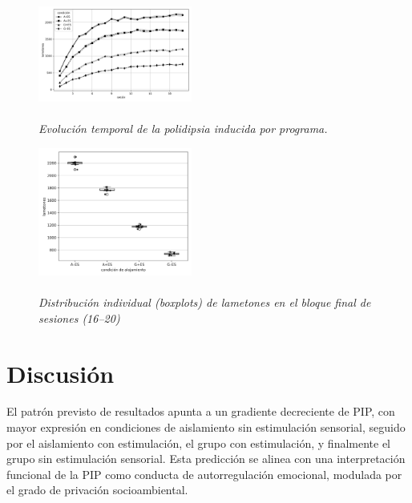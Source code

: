 \documentclass[12pt,a4paper]{article}
\begin{document}
\begin{multicols}{2}
\begin{figure}[H]
\begin{doublespace}
\captionsetup{labelfont=bf, labelsep=none}
\caption{\textit{\protect\\Evolución temporal de la polidipsia inducida por programa.}}
\label{fig:figura1}
\end{doublespace}
\centering
\includegraphics[width=0.45\textwidth]{figura1.png}
\end{figure}

\begin{figure}[H]
\begin{doublespace}
\captionsetup{labelfont=bf, labelsep=none}    
\caption{\textit{\protect\\Distribución individual (boxplots) de lametones en el bloque final de sesiones (16–20)}}
\label{fig:figura2}
\end{doublespace}
\centering
\includegraphics[width=0.45\textwidth]{figura2.png}
\end{figure}


\section{Discusión}

El patrón previsto de resultados apunta a un gradiente decreciente de PIP, con mayor expresión en condiciones de aislamiento sin estimulación sensorial, seguido por el aislamiento con estimulación, el grupo con estimulación, y finalmente el grupo sin estimulación sensorial. Esta predicción se alinea con una interpretación funcional de la PIP como conducta de autorregulación emocional, modulada por el grado de privación socioambiental.


\end{multicols}
\end{document}
